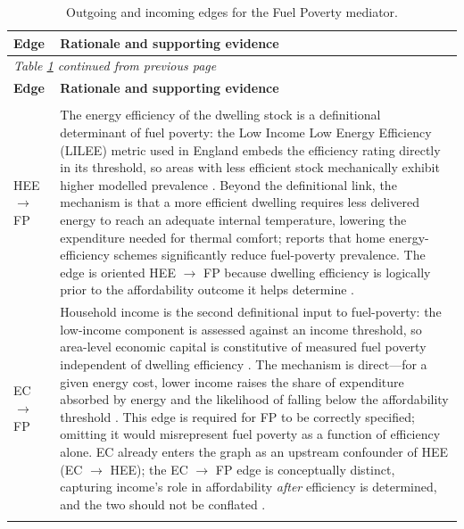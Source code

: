\begin{longtable}{@{}p{3.8cm}p{11.2cm}@{}}
\caption{Outgoing and incoming edges for the Fuel Poverty mediator.}
\label{tab:edges-fuel_poverty}\\
\toprule
\textbf{Edge} & \textbf{Rationale and supporting evidence} \\
\midrule
\endfirsthead
\multicolumn{2}{l}{\textit{Table \ref{tab:edges-fuel_poverty} continued from previous page}}\\
\toprule
\textbf{Edge} & \textbf{Rationale and supporting evidence} \\
\midrule
\endhead
\bottomrule
\endfoot
\multicolumn{2}{@{}l}{\textit{Inbound edges to Fuel Poverty}}\\
\addlinespace

HEE $\rightarrow$ FP &
The energy efficiency of the dwelling stock is a definitional determinant of fuel poverty: the Low Income Low Energy Efficiency (LILEE) metric used in England embeds the efficiency rating directly in its threshold, so areas with less efficient stock mechanically exhibit higher modelled prevalence \citep{department_for_energy_security_and_net_zero_annual_2024}. %
Beyond the definitional link, the mechanism is that a more efficient dwelling requires less delivered energy to reach an adequate internal temperature, lowering the expenditure needed for thermal comfort; \citet{sovacool_fuel_2015} reports that home energy-efficiency schemes significantly reduce fuel-poverty prevalence. %
The edge is oriented HEE $\rightarrow$ FP because dwelling efficiency is logically prior to the affordability outcome it helps determine \citep{roberts_energy_2008}. \\
\addlinespace

EC $\rightarrow$ FP &
Household income is the second definitional input to fuel-poverty: the low-income component is assessed against an income threshold, so area-level economic capital is constitutive of measured fuel poverty independent of dwelling efficiency \citep{department_for_energy_security_and_net_zero_annual_2024}. The mechanism is direct---for a given energy cost, lower income raises the share of expenditure absorbed by energy and the likelihood of falling below the affordability threshold \citep{galvin_juggling_2024}. This edge is required for FP to be correctly specified; omitting it would misrepresent fuel poverty as a function of efficiency alone. EC already enters the graph as an upstream confounder of HEE (EC $\rightarrow$ HEE); the EC $\rightarrow$ FP edge is conceptually distinct, capturing income's role in affordability \emph{after} efficiency is determined, and the two should not be conflated \citep{roberts_energy_2008}. \\
\addlinespace


\end{longtable}
